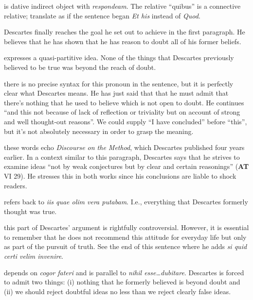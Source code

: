  is dative indirect object with \textit{respondeam}. The relative ``quibus'' is a connective relative; translate as if the sentence began \textit{Et his} instead of \textit{Quod}.

 Descartes finally reaches the goal he set out to achieve in the first paragraph. He believes that he has shown that he has reason to doubt all of his former beliefs.

 expresses a quasi-partitive idea. None of the things that Descartes previously believed to be true was beyond the reach of doubt.

 there is no precise syntax for this pronoun in the sentence, but it is perfectly clear what Descartes means. He has just said that that he must admit that there's nothing that he used to believe which is not open to doubt. He continues ``and this not because of lack of reflection or triviality but on account of strong and well thought-out reasons''. We could supply ``I have concluded'' before ``this'', but it's not absolutely necessary in order to grasp the meaning.

 these words echo \textit{Discourse on the Method}, which Descartes published four years earlier. In a context similar to this paragraph, Descartes says that he strives to examine ideas ``not by weak conjectures but by clear and certain reasonings'' (\textbf{AT} VI 29). He stresses this in both works since his conclusions are liable to shock readers.

 refers back to \textit{iis quae olim vera putabam}. I.e., everything that Descartes formerly thought was true.

 this part of Descartes' argument is rightfully controversial. However, it is essential to remember that he does not recommend this attitude for everyday life but only as part of the pursuit of truth. See the end of this sentence where he adds \textit{si quid certi velim invenire}.

 depends on \textit{cogor fateri} and is parallel to \textit{nihil esse\dots dubitare}. Descartes is forced to admit two things: (i) nothing that he formerly believed is beyond doubt and (ii) we should reject doubtful ideas no less than we reject clearly false ideas.


